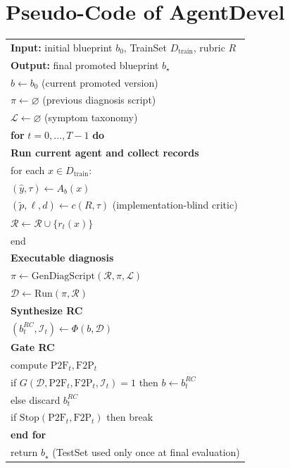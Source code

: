 \clearpage
\onecolumn
\section{Pseudo-Code of AgentDevel}
\begin{tcolorbox}[enhanced, breakable, colback=white, colframe=black!60, title=Algorithm 1: AgentDevel (release-engineering improvement)]
\small
\begin{longtable}{@{}l@{}}

\textbf{Input:} initial blueprint $b_0$, TrainSet $D_{\text{train}}$, rubric $R$\\
\textbf{Output:} final promoted blueprint $b_\star$\\[4pt]

$b \leftarrow b_0$ \hfill (current promoted version)\\
$\pi \leftarrow \varnothing$ \hfill (previous diagnosis script)\\
$\mathcal{L} \leftarrow \varnothing$ \hfill (symptom taxonomy)\\[4pt]

\textbf{for} $t=0,\dots,T-1$ \textbf{do}\\
\quad \textbf{Run current agent and collect records}\\
\quad for each $x\in D_{\text{train}}$:\\
\quad\quad $(\hat y,\tau)\leftarrow A_b(x)$\\
\quad\quad $(\tilde p,\ell,d)\leftarrow c(R,\tau)$ \hfill (implementation-blind critic)\\
\quad\quad $\mathcal{R}\leftarrow \mathcal{R}\cup\{r_t(x)\}$\\
\quad end\\[2pt]

\quad \textbf{Executable diagnosis}\\
\quad $\pi \leftarrow \mathrm{GenDiagScript}(\mathcal{R},\pi,\mathcal{L})$\\
\quad $\mathcal{D}\leftarrow \mathrm{Run}(\pi,\mathcal{R})$\\[2pt]

\quad \textbf{Synthesize RC}\\
\quad $(b_t^{RC},\mathcal{I}_t)\leftarrow \Phi(b,\mathcal{D})$\\[2pt]

\quad \textbf{Gate RC}\\
\quad compute $\mathrm{P2F}_t,\mathrm{F2P}_t$\\
\quad if $G(\mathcal{D},\mathrm{P2F}_t,\mathrm{F2P}_t,\mathcal{I}_t)=1$ then $b\leftarrow b_t^{RC}$\\
\quad else discard $b_t^{RC}$\\[2pt]

\quad if $\mathrm{Stop}(\mathrm{P2F}_t,\mathrm{F2P}_t)$ then break\\
\textbf{end for}\\[4pt]

return $b_\star$ \hfill (TestSet used only once at final evaluation)\\

\end{longtable}
\end{tcolorbox}

